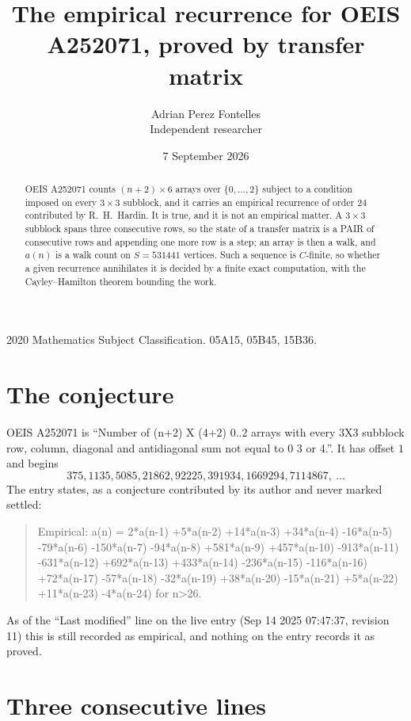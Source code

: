 \documentclass[11pt,a4paper]{article}
\title{The empirical recurrence for OEIS A252071, proved by transfer matrix}
\author{Adrian Perez Fontelles\\ \small Independent researcher}
\date{7 September 2026}
\theoremstyle{plain}
\theoremstyle{definition}
\begin{document}
\maketitle

\begin{abstract}
OEIS A252071 counts $(n+2)\times6$ arrays over $\{0,\dots,2\}$ subject to a condition imposed on
every $3\times3$ subblock, and it carries an empirical recurrence of order $24$
contributed by R.~H.~Hardin. It is true, and it is not an empirical matter. A $3\times3$
subblock spans three consecutive rows, so the state of a transfer matrix is a PAIR of
consecutive rows and appending one more row is a step; an array is then a walk, and
$a(n)$ is a walk count on $S=531441$ vertices. Such a sequence is $C$-finite, so whether a given
recurrence annihilates it is decided by a finite exact computation, with the Cayley--Hamilton
theorem bounding the work.
\end{abstract}

\noindent\small 2020 Mathematics Subject Classification. 05A15, 05B45, 15B36.\normalsize

\section{The conjecture}

OEIS A252071 is ``Number of (n+2) X (4+2) 0..2 arrays with every 3X3 subblock row, column, diagonal and antidiagonal sum not equal to 0 3 or 4.''. It has offset $1$ and begins
\[
375, 1135, 5085, 21862, 92225, 391934, 1669294, 7114867,\ \dots
\]
The entry states, as a conjecture contributed by its author and never marked settled:
\begin{quote}
Empirical: a(n) = 2*a(n-1) +5*a(n-2) +14*a(n-3) +34*a(n-4) -16*a(n-5) -79*a(n-6) -150*a(n-7) -94*a(n-8) +581*a(n-9) +457*a(n-10) -913*a(n-11) -631*a(n-12) +692*a(n-13) +433*a(n-14) -236*a(n-15) -116*a(n-16) +72*a(n-17) -57*a(n-18) -32*a(n-19) +38*a(n-20) -15*a(n-21) +5*a(n-22) +11*a(n-23) -4*a(n-24) for n>26.
\end{quote}
As of the ``Last modified'' line on the live entry (Sep 14 2025 07:47:37, revision 11) this is still
recorded as empirical, and nothing on the entry records it as proved.

\section{Three consecutive lines}
\end{document}
